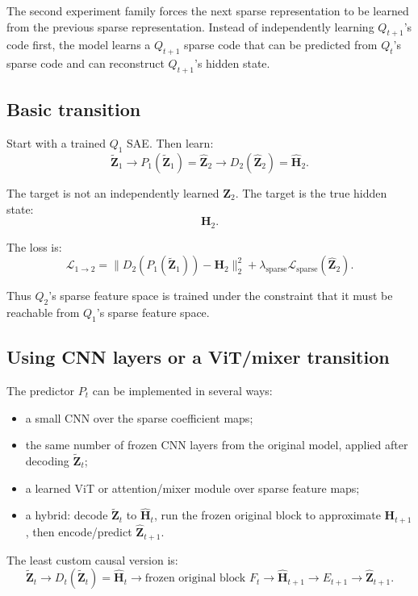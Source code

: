 \documentclass[11pt]{article}
\newcommand{\Htens}{\mathbf{H}}
\newcommand{\Ztens}{\mathbf{Z}}
\newcommand{\Hhat}{\widehat{\mathbf{H}}}
\newcommand{\Zhat}{\widehat{\mathbf{Z}}}
\newcommand{\Ztilde}{\widetilde{\mathbf{Z}}}
\begin{document}
The second experiment family forces the next sparse representation to be learned from the previous sparse representation. Instead of independently learning \(Q_{t+1}\)'s code first, the model learns a \(Q_{t+1}\) sparse code that can be predicted from \(Q_t\)'s sparse code and can reconstruct \(Q_{t+1}\)'s hidden state.

\subsection{Basic transition}

Start with a trained \(Q_1\) SAE. Then learn:
\[
\Ztilde_1
\rightarrow
P_1(\Ztilde_1)=\Zhat_2
\rightarrow
D_2(\Zhat_2)=\Hhat_2.
\]

The target is not an independently learned \(\Ztens_2\). The target is the true hidden state:
\[
\Htens_2.
\]

The loss is:
\[
\mathcal{L}_{1\rightarrow 2}
=
\|D_2(P_1(\Ztilde_1))-\Htens_2\|_2^2
+
\lambda_{\mathrm{sparse}}\mathcal{L}_{\mathrm{sparse}}(\Zhat_2).
\]

Thus \(Q_2\)'s sparse feature space is trained under the constraint that it must be reachable from \(Q_1\)'s sparse feature space.

\subsection{Using CNN layers or a ViT/mixer transition}

The predictor \(P_t\) can be implemented in several ways:

\begin{itemize}[leftmargin=*]
    \item a small CNN over the sparse coefficient maps;
    \item the same number of frozen CNN layers from the original model, applied after decoding \(\Ztilde_t\);
    \item a learned ViT or attention/mixer module over sparse feature maps;
    \item a hybrid: decode \(\Ztilde_t\) to \(\Hhat_t\), run the frozen original block to approximate \(\Htens_{t+1}\), then encode/predict \(\Zhat_{t+1}\).
\end{itemize}

The least custom causal version is:
\[
\Ztilde_t
\rightarrow
D_t(\Ztilde_t)=\Hhat_t
\rightarrow
\text{frozen original block } F_t
\rightarrow
\widehat{\Htens}_{t+1}
\rightarrow
E_{t+1}
\rightarrow
\Zhat_{t+1}.
\]
\end{document}
